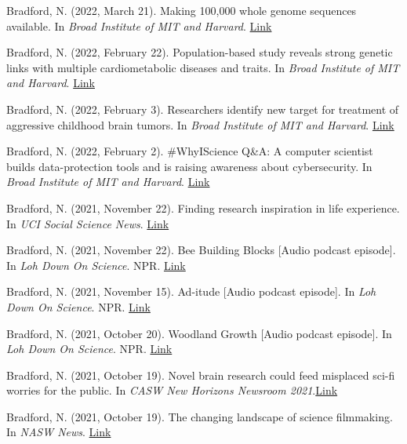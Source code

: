\documentclass[margin, 10pt]{res} %
\begin{document}
\begin{resume}
Bradford, N. (2022, March 21). Making 100,000 whole genome sequences available. In {\sl Broad Institute of MIT and Harvard}. \href{https://www.broadinstitute.org/news/making-100000-whole-genome-sequences-available}{Link}


Bradford, N. (2022, February 22). Population-based study reveals strong genetic links with multiple cardiometabolic diseases and traits. In {\sl Broad Institute of MIT and Harvard}. \href{https://www.broadinstitute.org/news/population-based-study-reveals-strong-genetic-links-multiple-cardiometabolic-diseases-and-0}{Link}

Bradford, N. (2022, February 3). Researchers identify new target for treatment of aggressive childhood brain tumors. In {\sl Broad Institute of MIT and Harvard}. \href{https://www.broadinstitute.org/news/researchers-identify-new-target-treatment-aggressive-childhood-brain-tumors}{Link}

Bradford, N. (2022, February 2). \#WhyIScience Q\&A: A computer scientist builds data-protection tools and is raising awareness about cybersecurity. In {\sl Broad Institute of MIT and Harvard}. \href{https://www.broadinstitute.org/blog/whyiscience-qa-computer-scientist-builds-data-protection-tools-and-raising-awareness-about}{Link}

Bradford, N. (2021, November 22). Finding research inspiration in life experience. In {\sl UCI Social Science News}. \href{https://www.socsci.uci.edu/newsevents/news/2021/2021-11-22-zeinab-kachakeche.php}{Link}

Bradford, N. (2021, November 22). Bee Building Blocks [Audio podcast episode]. In {\sl Loh Down On Science}. NPR. \href{https://lohdownonscience.com/bee-building-blocks/}{Link}

Bradford, N. (2021, November 15). Ad-itude [Audio podcast episode]. In {\sl Loh Down On Science}. NPR. \href{https://lohdownonscience.com/ad-itude/}{Link}

Bradford, N. (2021, October 20). Woodland Growth [Audio podcast episode]. In {\sl Loh Down On Science}. NPR. \href{https://lohdownonscience.com/woodland-growth/}{Link}

Bradford, N. (2021, October 19). Novel brain research could feed misplaced sci-fi worries for the public. In {\sl CASW New Horizons Newsroom 2021}.\href{https://casw.org/news/novel-brain-research-could-feed-misplaced-sci-fi-worries-for-the-public/}{Link} 

Bradford, N. (2021, October 19). The changing landscape of science filmmaking. In {\sl NASW News}. \href{https://www.nasw.org/article/changing-landscape-science-filmmaking}{Link} 


\end{resume}
\end{document}
